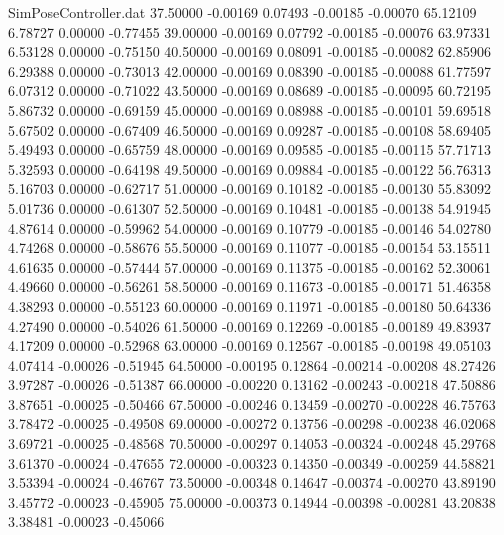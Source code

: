 \begin{filecontents}{SimPoseController.dat}
  37.50000   -0.00169    0.07493    -0.00185   -0.00070   65.12109    6.78727    0.00000   -0.77455
  39.00000   -0.00169    0.07792    -0.00185   -0.00076   63.97331    6.53128    0.00000   -0.75150
  40.50000   -0.00169    0.08091    -0.00185   -0.00082   62.85906    6.29388    0.00000   -0.73013
  42.00000   -0.00169    0.08390    -0.00185   -0.00088   61.77597    6.07312    0.00000   -0.71022
  43.50000   -0.00169    0.08689    -0.00185   -0.00095   60.72195    5.86732    0.00000   -0.69159
  45.00000   -0.00169    0.08988    -0.00185   -0.00101   59.69518    5.67502    0.00000   -0.67409
  46.50000   -0.00169    0.09287    -0.00185   -0.00108   58.69405    5.49493    0.00000   -0.65759
  48.00000   -0.00169    0.09585    -0.00185   -0.00115   57.71713    5.32593    0.00000   -0.64198
  49.50000   -0.00169    0.09884    -0.00185   -0.00122   56.76313    5.16703    0.00000   -0.62717
  51.00000   -0.00169    0.10182    -0.00185   -0.00130   55.83092    5.01736    0.00000   -0.61307
  52.50000   -0.00169    0.10481    -0.00185   -0.00138   54.91945    4.87614    0.00000   -0.59962
  54.00000   -0.00169    0.10779    -0.00185   -0.00146   54.02780    4.74268    0.00000   -0.58676
  55.50000   -0.00169    0.11077    -0.00185   -0.00154   53.15511    4.61635    0.00000   -0.57444
  57.00000   -0.00169    0.11375    -0.00185   -0.00162   52.30061    4.49660    0.00000   -0.56261
  58.50000   -0.00169    0.11673    -0.00185   -0.00171   51.46358    4.38293    0.00000   -0.55123
  60.00000   -0.00169    0.11971    -0.00185   -0.00180   50.64336    4.27490    0.00000   -0.54026
  61.50000   -0.00169    0.12269    -0.00185   -0.00189   49.83937    4.17209    0.00000   -0.52968
  63.00000   -0.00169    0.12567    -0.00185   -0.00198   49.05103    4.07414   -0.00026   -0.51945
  64.50000   -0.00195    0.12864    -0.00214   -0.00208   48.27426    3.97287   -0.00026   -0.51387
  66.00000   -0.00220    0.13162    -0.00243   -0.00218   47.50886    3.87651   -0.00025   -0.50466
  67.50000   -0.00246    0.13459    -0.00270   -0.00228   46.75763    3.78472   -0.00025   -0.49508
  69.00000   -0.00272    0.13756    -0.00298   -0.00238   46.02068    3.69721   -0.00025   -0.48568
  70.50000   -0.00297    0.14053    -0.00324   -0.00248   45.29768    3.61370   -0.00024   -0.47655
  72.00000   -0.00323    0.14350    -0.00349   -0.00259   44.58821    3.53394   -0.00024   -0.46767
  73.50000   -0.00348    0.14647    -0.00374   -0.00270   43.89190    3.45772   -0.00023   -0.45905
  75.00000   -0.00373    0.14944    -0.00398   -0.00281   43.20838    3.38481   -0.00023   -0.45066

\end{filecontents}
